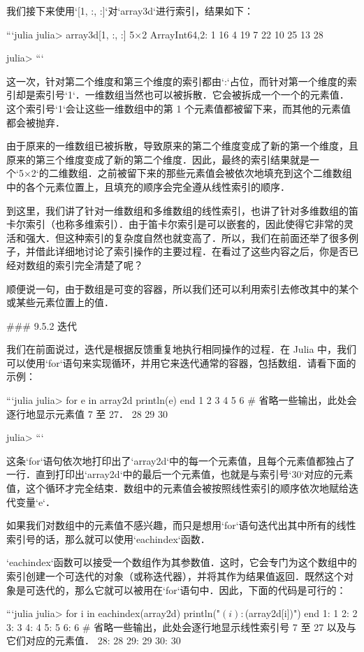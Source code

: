 我们接下来使用`[1, :, :]`对`array3d`进行索引，结果如下：

```julia
julia> array3d[1, :, :]
5×2 Array{Int64,2}:
  1  16
  4  19
  7  22
 10  25
 13  28

julia> 
```

这一次，针对第二个维度和第三个维度的索引都由`:`占位，而针对第一个维度的索引却是索引号`1`．一维数组当然也可以被拆散．它会被拆成一个一个的元素值．这个索引号`1`会让这些一维数组中的第 1 个元素值都被留下来，而其他的元素值都会被抛弃．

由于原来的一维数组已被拆散，导致原来的第二个维度变成了新的第一个维度，且原来的第三个维度变成了新的第二个维度．因此，最终的索引结果就是一个`5×2`的二维数组．之前被留下来的那些元素值会被依次地填充到这个二维数组中的各个元素位置上，且填充的顺序会完全遵从线性索引的顺序．

到这里，我们讲了针对一维数组和多维数组的线性索引，也讲了针对多维数组的笛卡尔索引（也称多维索引）．由于笛卡尔索引是可以嵌套的，因此使得它非常的灵活和强大．但这种索引的复杂度自然也就变高了．所以，我们在前面还举了很多例子，并借此详细地讨论了索引操作的主要过程．在看过了这些内容之后，你是否已经对数组的索引完全清楚了呢？

顺便说一句，由于数组是可变的容器，所以我们还可以利用索引去修改其中的某个或某些元素位置上的值．

### 9.5.2 迭代

我们在前面说过，迭代是根据反馈重复地执行相同操作的过程．在 Julia 中，我们可以使用`for`语句来实现循环，并用它来迭代通常的容器，包括数组．请看下面的示例：

```julia
julia> for e in array2d
           println(e)
       end
1
2
3
4
5
6
# 省略一些输出，此处会逐行地显示元素值 7 至 27．
28
29
30

julia> 
```

这条`for`语句依次地打印出了`array2d`中的每一个元素值，且每个元素值都独占了一行．直到打印出`array2d`中的最后一个元素值，也就是与索引号`30`对应的元素值，这个循环才完全结束．数组中的元素值会被按照线性索引的顺序依次地赋给迭代变量`e`．

如果我们对数组中的元素值不感兴趣，而只是想用`for`语句迭代出其中所有的线性索引号的话，那么就可以使用`eachindex`函数．

`eachindex`函数可以接受一个数组作为其参数值．这时，它会专门为这个数组中的索引创建一个可迭代的对象（或称迭代器），并将其作为结果值返回．既然这个对象是可迭代的，那么它就可以被用在`for`语句中．因此，下面的代码是可行的：

```julia
julia> for i in eachindex(array2d)
           println("$(i): $(array2d[i])")
       end
1: 1
2: 2
3: 3
4: 4
5: 5
6: 6
# 省略一些输出，此处会逐行地显示线性索引号 7 至 27 以及与它们对应的元素值．
28: 28
29: 29
30: 30

